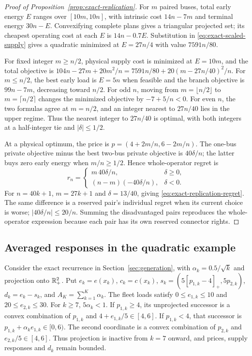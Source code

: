 \begin{proof}[Proof of Proposition~\ref{prop:exact-replication}]
For $m$ paired buses, total early energy $E$ ranges over
$[10m,10n]$, with intrinsic cost $14n-7m$ and terminal energy
$30n-E$.  Convexifying complete plans gives a triangular projected set;
its cheapest operating cost at each $E$ is $14n-0.7E$.  Substitution in
\eqref{eq:exact-scaled-supply} gives a quadratic minimized at
$E=27n/4$ with value $7591n/80$.

For fixed integer $m\geq n/2$, physical supply cost is minimized at
$E=10m$, and the total objective is
$104n-27m+20m^2/n=7591n/80+20(m-27n/40)^2/n$.
For $m\leq n/2$, the best early load is $E=5n$ when feasible and the
branch objective is $99n-7m$, decreasing toward $n/2$.  For odd $n$, moving from $m=\lfloor n/2\rfloor$ to
$m=\lceil n/2\rceil$ changes the minimized objective by $-7+5/n<0$.
For even $n$, the two formulas agree at $m=n/2$, and an integer nearest
to $27n/40$ lies in the upper regime.  Thus the nearest integer to
$27n/40$ is optimal,
with both integers at a half-integer tie and $|\delta|\leq1/2$.

At a physical optimum, the price is
$p=(4+2m/n,6-2m/n)$.  The one-bus private objective minus the best
two-bus private objective is $40\delta/n$; the latter buys zero early
energy when $m/n\geq1/2$.  Hence whole-operator regret is
\[
 r_n=\begin{cases}
 m\,40\delta/n,&\delta\geq0,\\
 (n-m)(-40\delta/n),&\delta<0.
 \end{cases}
\]
For $n=40k+1$, $m=27k+1$ and $\delta=13/40$, giving
\eqref{eq:exact-replication-regret}.  The same difference is a
reserved pair's individual regret when its current choice is worse;
$|40\delta/n|\leq20/n$.  Summing the disadvantaged pairs reproduces
the whole-operator expression because each pair has its own reserved
connector rights.
\end{proof}

\subsection{Averaged responses in the quadratic example}\label{app:averaged-responses}

Consider the exact recurrence in Section~\ref{sec:generation}, with
$\alpha_k=0.5/\sqrt{k}$ and projection onto $\mathbb R_+^2$. Put
$e_k=e(x_k)$, $c_k=c(x_k)$, $s_k=(5[p_{1,k}-4]_+,5p_{2,k})$,
$d_k=e_k-s_k$, and $A_K=\sum_{k=1}^K\alpha_k$.
The fleet loads satisfy $0\le e_{1,k}\le10$ and $20\le e_{2,k}\le30$.
For $k\ge7$, $5\alpha_k<1$. If $p_{1,k}\ge4$, its unprojected successor
is a convex combination of $p_{1,k}$ and $4+e_{1,k}/5\in[4,6]$.
If $p_{1,k}<4$, that successor is $p_{1,k}+\alpha_ke_{1,k}\in[0,6)$.
The second coordinate is a convex combination of $p_{2,k}$ and
$e_{2,k}/5\in[4,6]$. Thus projection is inactive from $k=7$ onward,
and prices, supply responses and $d_k$ remain bounded.

